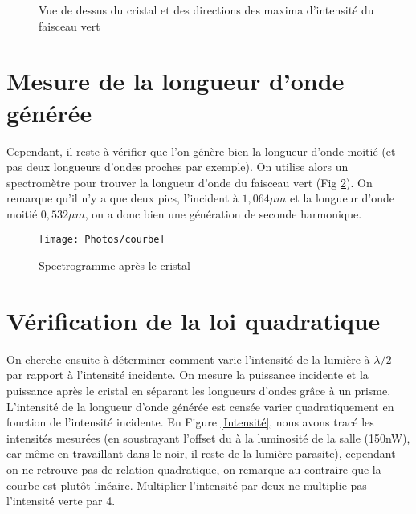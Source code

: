 \documentclass[a4paper,11pt]{report}
\begin{document}
\begin{figure}
    \centering
    \caption{Vue de dessus du cristal et des directions des maxima d'intensité du faisceau vert}
    \label{anglesONL}

\end{figure}

\section{Mesure de la longueur d'onde générée}
Cependant, il reste à vérifier que l'on génère bien la longueur d'onde moitié (et pas deux longueurs d'ondes proches par exemple). On utilise alors un spectromètre pour trouver la longueur d'onde du faisceau vert (Fig \ref{spectro}). On remarque qu'il n'y a que deux pics, l'incident à $1,064\mu m$ et la longueur d'onde moitié $0,532\mu m$, on a donc bien une génération de seconde harmonique.

\begin{figure}[H]
\centering
    \texttt{[image: Photos/courbe]}
    \caption{Spectrogramme après le cristal}
    \label{spectro}
\end{figure}

\section{Vérification de la loi quadratique}
On cherche ensuite à déterminer comment varie l'intensité de la lumière à $\lambda/2$ par rapport à l'intensité incidente. On mesure la puissance incidente et la puissance après le cristal en séparant les longueurs d'ondes grâce à un prisme. L'intensité de la longueur d'onde générée est censée varier quadratiquement en fonction de l'intensité incidente. En Figure \ref{Intensité}, nous avons tracé les intensités mesurées (en soustrayant l'offset du à la luminosité de la salle (150nW), car même en travaillant dans le noir, il reste de la lumière parasite), cependant on ne retrouve pas de relation quadratique, on remarque au contraire que la courbe est plutôt linéaire. Multiplier l'intensité par deux ne multiplie pas l'intensité verte par 4. 
\end{document}
